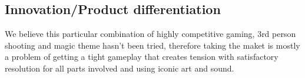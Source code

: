 \documentclass[a4paper, 11pt]{article}
\begin{document}
\subsection*{Innovation/Product differentiation}
We believe this particular combination of highly competitive gaming, 3rd person shooting and magic theme hasn't been tried, therefore taking the maket is mostly a problem of getting a tight gameplay that creates tension with satisfactory resolution for all parts involved and using iconic art and sound.
\end{document}
